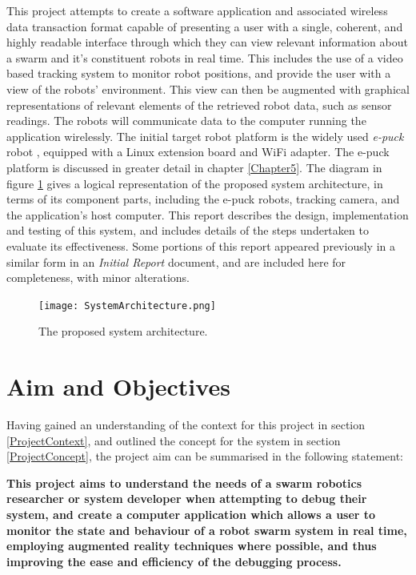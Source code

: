 This project attempts to create a software application and associated wireless data transaction format capable of presenting a user with a single, coherent, and highly readable interface through which they can view relevant information about a swarm and it's constituent robots in real time. This includes the use of a video based tracking system to monitor robot positions, and provide the user with a view of the robots' environment. This view can then be augmented with graphical representations of relevant elements of the retrieved robot data, such as sensor readings. The robots will communicate data to the computer running the application wirelessly. The initial target robot platform is the widely used \textit{e-puck} robot \cite{epuck}, equipped with a Linux extension board and WiFi adapter. The e-puck platform is discussed in greater detail in chapter \ref{Chapter5}. The diagram in figure \ref{fig:SystemArchitecture} gives a logical representation of the proposed system architecture, in terms of its component parts, including the e-puck robots, tracking camera, and the application's host computer. This report describes the design, implementation and testing of this system, and includes details of the steps undertaken to evaluate its effectiveness. Some portions of this report appeared previously in a similar form in an \textit{Initial Report} document, and are included here for completeness, with minor alterations.

\begin{figure}
	\begin{center}
	\texttt{[image: SystemArchitecture.png]}
	\decoRule
	\caption[Proposed system architecture]{The proposed system architecture.}
	\label{fig:SystemArchitecture}
	\end{center}
\end{figure}


\section{Aim and Objectives}
Having gained an understanding of the context for this project in section \ref{ProjectContext}, and outlined the concept for the system in section \ref{ProjectConcept}, the project aim can be summarised in the following statement: 

\noindent\textbf{This project aims to understand the needs of a swarm robotics researcher or system developer when attempting to debug their system, and create a computer application which allows a user to monitor the state and behaviour of a robot swarm system in real time, employing augmented reality techniques where possible, and thus improving the ease and efficiency of the debugging process.}

